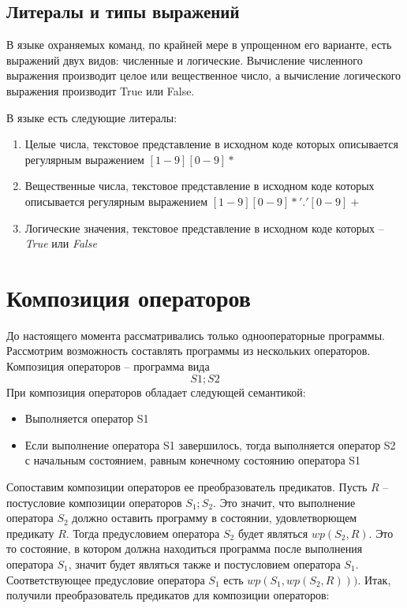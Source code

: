 	\subsection{Литералы и типы выражений}
	В языке охраняемых команд, по крайней мере в упрощенном его варианте, есть выражений двух видов: численные и логические.
	Вычисление численного выражения производит целое или вещественное число, а вычисление логического выражения
	производит True или False. 
	
	В языке есть следующие литералы:
	\begin{enumerate}
		\item Целые числа, текстовое представление в исходном коде которых описывается регулярным выражением $[1-9][0-9]*$
		\item Вещественные числа, текстовое представление в исходном коде которых описывается регулярным выражением 
		$[1-9][0-9]* '.' [0-9]+$
		\item Логические значения, текстовое представление в исходном коде которых -- \textit{True} или \textit{False}
	\end{enumerate}

\section{Композиция операторов}
До настоящего момента рассматривались только однооператорные программы. Рассмотрим возможность составлять
программы из нескольких операторов. Композиция операторов -- программа вида
$$ S1; S2 $$
При композиция операторов обладает следующей семантикой:
\begin{itemize}
	\item Выполняется оператор S1
	\item Если выполнение оператора S1 завершилось, тогда выполняется оператор S2 с начальным состоянием,
	равным конечному состоянию оператора S1
\end{itemize}

Сопоставим композиции операторов ее преобразователь предикатов. Пусть $R$ -- постусловие композиции операторов $S_1; S_2$.
Это значит, что выполнение оператора $S_2$ должно оставить программу в состоянии, удовлетворющем предикату $R$.
Тогда предусловием оператора $S_2$ будет являться $wp(S_2 ,R)$. Это то состояние, в котором должна находиться программа
после выполнения оператора $S_1$, значит будет являться также и постусловием оператора $S_1$. Соответствующее предусловие
оператора $S_1$ есть $wp(S_1, wp(S_2, R)))$. Итак, получили преобразователь предикатов для композиции операторов:

